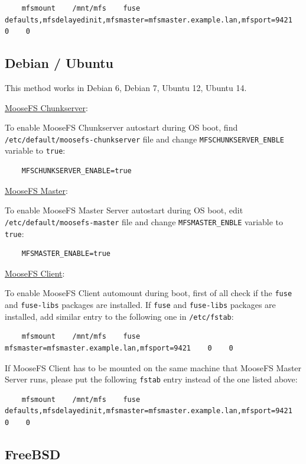\documentclass[a4paper,11pt,english]{report}
\def\code#1{\texttt{#1}}
\begin{document}
		\begin{lstlisting}
	mfsmount    /mnt/mfs    fuse    defaults,mfsdelayedinit,mfsmaster=mfsmaster.example.lan,mfsport=9421    0    0 
		\end{lstlisting}
		

		\subsection{Debian / Ubuntu}
		This method works in Debian 6, Debian 7, Ubuntu 12, Ubuntu 14.
		
		\underline{MooseFS Chunkserver}:
		
		To enable MooseFS Chunkserver autostart during OS boot, find \code{/etc/default/moosefs-chunkserver} file and change \code{MFSCHUNKSERVER\_ENBLE} variable to \code{true}:
		\begin{lstlisting}
	MFSCHUNKSERVER_ENABLE=true
		\end{lstlisting}
		
		\underline{MooseFS Master}:
		
		To enable MooseFS Master Server autostart during OS boot, edit \code{/etc/default/moosefs-master} file and change \code{MFSMASTER\_ENBLE} variable to \code{true}:
		\begin{lstlisting}
	MFSMASTER_ENABLE=true
		\end{lstlisting}

		\underline{MooseFS Client}:
			
		To enable MooseFS Client automount during boot, first of all check if the \code{fuse} and \code{fuse-libs} packages are installed. If \code{fuse} and \code{fuse-libs} packages are installed, add similar entry to the following one in \code{/etc/fstab}:

		\begin{lstlisting}
	mfsmount    /mnt/mfs    fuse    mfsmaster=mfsmaster.example.lan,mfsport=9421    0    0 
		\end{lstlisting}

		If MooseFS Client has to be mounted on the same machine that MooseFS Master Server runs, please put the following \code{fstab} entry instead of the one listed above:
		
		\begin{lstlisting}
	mfsmount    /mnt/mfs    fuse    defaults,mfsdelayedinit,mfsmaster=mfsmaster.example.lan,mfsport=9421    0    0 
		\end{lstlisting}


		
				
		\subsection{FreeBSD}
\end{document}
